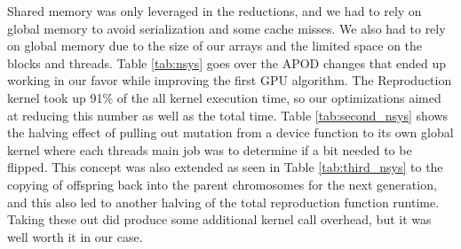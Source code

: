 \documentclass[11pt]{article}       %
\begin{document}
Shared memory was only leveraged in the reductions, and we had to rely on global memory to avoid serialization and some cache misses. We also had to rely on global memory due to the size of our arrays and the limited space on the blocks and threads. Table \ref{tab:nsys} goes over the APOD changes that ended up working in our favor while improving the first GPU algorithm. The Reproduction kernel took up 91\% of the all kernel execution time, so our optimizations aimed at reducing this number as well as the total time. Table \ref{tab:second_nsys} shows the halving effect of pulling out mutation from a device function to its own global kernel where each threads main job was to determine if a bit needed to be flipped. This concept was also extended as seen in Table \ref{tab:third_nsys} to the copying of offspring back into the parent chromosomes for the next generation, and this also led  to another halving of the total reproduction function runtime. Taking these out did produce some additional kernel call overhead, but it was well worth it in our case.
\end{document}
